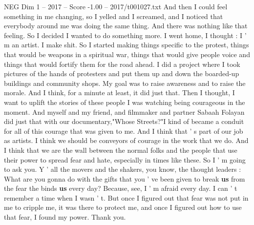 \begin{textsample}{NEG Dim 1 – 2017 – Score -1.00 – 2017/t001027.txt}
And then I could feel something in me changing, so I yelled and I screamed, and I noticed that everybody around me was doing the same thing.
And there was nothing like that feeling.
So I decided I wanted to do something more.
I went home, I thought : I ' m an artist.
I make shit.
So I started making things specific to the protest, things that would be weapons in a spiritual war, things that would give people voice and things that would fortify them for the road ahead.
I did a project where I took pictures of the hands of protesters and put them up and down the boarded-up buildings and community shops.
My goal was to raise awareness and to raise the morale.
And I think, for a minute at least, it did just that.
Then I thought, I want to uplift the stories of these people I was watching being courageous in the moment.
And myself and my friend, and filmmaker and partner Sabaah Folayan did just that with our documentary,"Whose Streets?"I kind of became a conduit for all of this courage that was given to me.
And I think that ' s part of our job as artists.
I think we should be conveyors of courage in the work that we do.
And I think that we are the wall between the normal folks and the people that use their power to spread fear and hate, especially in times like these.
So I ' m going to ask you.
Y ' all the movers and the shakers, you know, the thought leaders : What are you gonna do with the gifts that you ' ve been given to break \textbf{us} from the fear the binds \textbf{us} every day?
Because, see, I ' m afraid every day.
I can ' t remember a time when I wasn ' t.
But once I figured out that fear was not put in me to cripple me, it was there to protect me, and once I figured out how to use that fear, I found my power.
Thank you.

\end{textsample}
